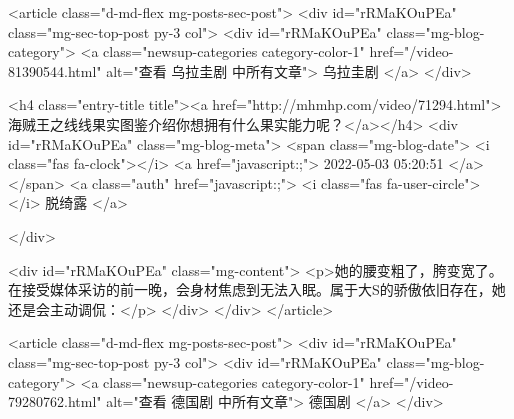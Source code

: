                                     <article class="d-md-flex mg-posts-sec-post">
                                        <div id="rRMaKOuPEa"  class="mg-sec-top-post py-3 col">
                                            <div id="rRMaKOuPEa"  class="mg-blog-category">
                                                <a class="newsup-categories category-color-1" href="/video-81390544.html" alt="查看 乌拉圭剧 中所有文章">
                                                    乌拉圭剧
                                                </a>
                                            </div>

                                            <h4 class="entry-title title"><a href="http://mhmhp.com/video/71294.html">海贼王之线线果实图鉴介绍你想拥有什么果实能力呢？</a></h4>
                                            <div id="rRMaKOuPEa"  class="mg-blog-meta">
                                                <span class="mg-blog-date">
                                                    <i class="fas fa-clock"></i>
                                                    <a href="javascript:;">
                                                        2022-05-03 05:20:51
                                                    </a>
                                                </span>
                                                <a class="auth" href="javascript:;">
                                                    <i class="fas fa-user-circle"></i>
                                                    脱绮露
                                                </a>

                                            </div>


                                            <div id="rRMaKOuPEa"  class="mg-content">
                                                <p>她的腰变粗了，胯变宽了。在接受媒体采访的前一晚，会身材焦虑到无法入眠。属于大S的骄傲依旧存在，她还是会主动调侃：</p>
                                            </div>
                                        </div>
                                    </article>
                                    
                                    <article class="d-md-flex mg-posts-sec-post">
                                        <div id="rRMaKOuPEa"  class="mg-sec-top-post py-3 col">
                                            <div id="rRMaKOuPEa"  class="mg-blog-category">
                                                <a class="newsup-categories category-color-1" href="/video-79280762.html" alt="查看 德国剧 中所有文章">
                                                    德国剧
                                                </a>
                                            </div>

